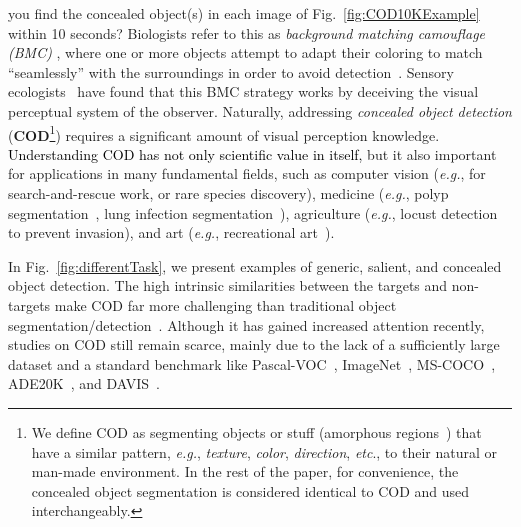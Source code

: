 \documentclass[10pt,journal,compsoc]{IEEEtran}
\def\eg{\emph{e.g.}}
\def\etc{\emph{etc}}
\newcommand{\figref}[1]{Fig.~\ref{#1}}
\newcommand{\Rev}[1]{\textcolor{black}{#1}}
\begin{document}
\maketitle

\IEEEdisplaynontitleabstractindextext



\IEEEpeerreviewmaketitle


 you find the concealed object(s) in each image of 
\figref{fig:COD10KExample} within 10 seconds? 
Biologists refer to this as \emph{background matching camouflage (BMC)}
\cite{cuthill2005disruptive}, 
where one or more objects attempt to adapt their coloring to match 
``seamlessly'' with the surroundings in order 
to avoid detection~\cite{owens2014camouflaging}.
Sensory ecologists~\cite{stevens2008animal} have found that this BMC strategy 
works by deceiving the visual perceptual system of the observer.
Naturally, addressing \emph{concealed object detection} 
(\textbf{COD}\footnote{We define COD as segmenting objects or stuff 
(amorphous regions~\cite{kirillov2019panoptic}) 
that have a similar pattern, \eg, \emph{texture}, \emph{color}, 
\emph{direction}, \etc., to their natural or man-made environment. 
In the rest of the paper, for convenience, the concealed object segmentation 
is considered identical to COD and used interchangeably.}) 
requires a significant amount of visual perception
\cite{troscianko2008camouflage} knowledge.
\Rev{Understanding COD has not only scientific value in itself,} but it also 
important for applications in many fundamental fields, 
such as computer vision 
(\eg, for search-and-rescue work, or rare species discovery), 
medicine (\eg, polyp segmentation~\cite{fan2020pranet}, 
lung infection segmentation~\cite{fan2020inf}), 
agriculture (\eg, locust detection to prevent invasion), 
and art (\eg, recreational art~\cite{chu2010camouflage}).


In \figref{fig:differentTask}, we present examples of generic, salient, 
and concealed object detection.
The high intrinsic similarities between the targets and non-targets make 
COD far more challenging than traditional object segmentation/detection~\cite{zhao2019object,Fan2021SOC,zhao2019EGNet}.
Although it has gained increased attention recently, 
studies on COD still remain scarce, 
mainly due to the lack of a sufficiently large dataset and a standard benchmark
like Pascal-VOC~\cite{everingham2010pascal}, 
ImageNet~\cite{deng2009imagenet}, MS-COCO~\cite{lin2014microsoft}, 
ADE20K~\cite{zhou2017scene}, and DAVIS~\cite{perazzi2016benchmark}.
\end{document}
